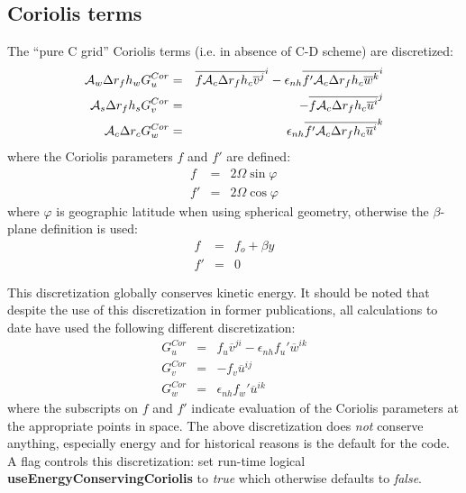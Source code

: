 \subsection{Coriolis terms}

The ``pure C grid'' Coriolis terms (i.e. in absence of C-D scheme) are
discretized:
\begin{eqnarray}
{\cal A}_w \Delta r_f h_w G_u^{Cor} & = &
  \overline{ f {\cal A}_c \Delta r_f h_c \overline{ v }^j }^i
- \epsilon_{nh} \overline{ f' {\cal A}_c \Delta r_f h_c \overline{ w }^k }^i \\
{\cal A}_s \Delta r_f h_s G_v^{Cor} & = &
- \overline{ f {\cal A}_c \Delta r_f h_c \overline{ u }^i }^j \\
{\cal A}_c \Delta r_c G_w^{Cor} & = &
 \epsilon_{nh} \overline{ f' {\cal A}_c \Delta r_f h_c \overline{ u }^i }^k
\end{eqnarray}
where the Coriolis parameters $f$ and $f'$ are defined:
\begin{eqnarray}
f & = & 2 \Omega \sin{\varphi} \\
f' & = & 2 \Omega \cos{\varphi}
\end{eqnarray}
where $\varphi$ is geographic latitude when using spherical geometry,
otherwise the $\beta$-plane definition is used:
\begin{eqnarray}
f & = & f_o + \beta y \\
f' & = & 0
\end{eqnarray}

This discretization globally conserves kinetic energy. It should be
noted that despite the use of this discretization in former
publications, all calculations to date have used the following
different discretization:
\begin{eqnarray}
G_u^{Cor} & = &
  f_u \overline{ v }^{ji}
- \epsilon_{nh} f_u' \overline{ w }^{ik} \\
G_v^{Cor} & = &
- f_v \overline{ u }^{ij} \\
G_w^{Cor} & = &
 \epsilon_{nh} f_w' \overline{ u }^{ik}
\end{eqnarray}
where the subscripts on $f$ and $f'$ indicate evaluation of the
Coriolis parameters at the appropriate points in space. The above
discretization does {\em not} conserve anything, especially energy and
for historical reasons is the default for the code. A
flag controls this discretization: set run-time logical {\bf
useEnergyConservingCoriolis} to {\em true} which otherwise defaults to
{\em false}.

